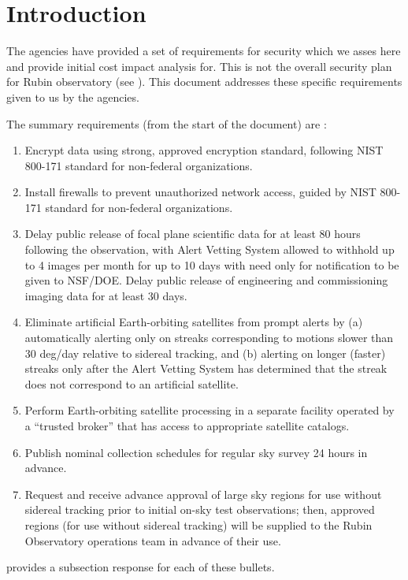\section{Introduction}

The agencies have provided a set of requirements for security which we asses here and provide initial cost impact analysis for.  This is not the overall security plan for Rubin observatory (see ).
This document addresses these specific requirements given to us by the agencies.

The summary requirements (from the start of the document) are :
\begin{enumerate}

\item	Encrypt data using strong, approved encryption standard, following NIST 800-171 standard for  non-federal organizations.
\item	Install firewalls to prevent unauthorized network access, guided by NIST 800-171 standard for  non-federal organizations.
\item	Delay public release of focal plane scientific data for at least 80 hours following the observation, with Alert Vetting System allowed to withhold up to 4 images per month for up to 10 days with need only for notification to be given to NSF/DOE. Delay public release of engineering and commissioning imaging data for at least 30 days.
\item	Eliminate artificial Earth-orbiting satellites from prompt alerts by (a) automatically alerting only on streaks corresponding to motions slower than 30 deg/day relative to sidereal tracking, and (b) alerting on longer (faster) streaks only after the Alert Vetting System has determined that the streak does not correspond to an artificial satellite.
\item	Perform Earth-orbiting satellite processing in a separate facility operated by a “trusted broker” that has access to appropriate satellite catalogs.
\item	Publish nominal collection schedules for regular sky survey 24 hours in advance.
\item	Request and receive advance approval of large sky regions for use without sidereal tracking prior to initial on-sky test observations; then, approved regions (for use without sidereal tracking) will be supplied to the Rubin Observatory operations team in advance of their use.

\end{enumerate}


 provides a subsection response for each of these bullets.
